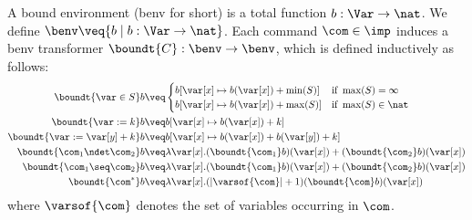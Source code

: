 \begin{definition}
  \label{de:boundenv}
  A bound environment (benv for short) is a total function \(b:\Var
  \to \nat\). We define \(\benv \veq \{ b \mid b:\Var \to \nat\}\).
  Each command \(\com\in \imp\) induces a benv transformer
  \(\boundt{C}:\benv \to \benv\), which is defined inductively as
  follows:
  \begin{align*}
    \boundt{\var \in S}b  
    & \veq 
    \begin{cases} 
      b[\var[x]\mapsto b(\var[x])+\min(S)]& \text{if }\max(S)=\infty\\
      b[\var[x]\mapsto b(\var[x])+\max(S)]& \text{if }\max(S)\in \nat
    \end{cases}
    \\
    \boundt{\var := k}b 
    & \veq  b[\var[x]\mapsto b(\var[x])+k]\\
    \boundt{\var := \var[y] + k}b
    & \veq  b[\var[x]\mapsto b(\var[x])+b(\var[y])+k]\\
    \boundt{\com_1 \ndet \com_2}b
    & \veq \lambda \var[x]. (\boundt{\com_1}b)(\var[x]) + (\boundt{\com_2}b)(\var[x])\\
    \boundt{\com_1 \seq \com_2}b
    & \veq \lambda \var[x]. (\boundt{\com_1}b)(\var[x]) + (\boundt{\com_2}b)(\var[x])\\
    \boundt{\com^*}b
    &\veq  \lambda \var[x]. (|\varsof{\com}|+1)(\boundt{\com}b)(\var[x])
  \end{align*}    
  where \(\varsof{\com}\) denotes the set of variables occurring
  in \(\com\).
\end{definition}

